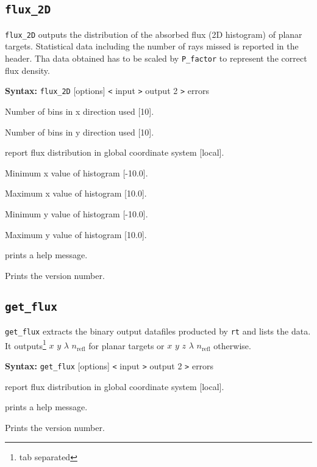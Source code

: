 \documentclass[10pt,a4paper,titlepage]{article}
\begin{document}
\subsection{{\tt flux\_2D}}
{\tt flux\_2D} outputs the distribution of the absorbed flux (2D histogram) of planar targets. Statistical data including the number of rays missed is reported in the header. Tha data obtained has to be scaled by {\tt P\_factor} to represent the correct flux density.

{\bf Syntax:} {\tt flux\_2D} [options] {\tt <} input {\tt >} output 2 {\tt >} errors
\vspace{1em}
\begin{list}{}
{\setlength{\leftmargin}{3.5cm}
\setlength{\labelwidth}{3.0cm}
\setlength{\labelsep}{0.25cm}
\setlength{\rightmargin}{0.5cm}}

\item[{\tt [--nx|-a]}] Number of bins in x direction used [10].
\item[{\tt [--ny|-b]}] Number of bins in y direction used [10].
\item[{\tt [--global|-g]}] report flux distribution in global coordinate system [local].
\item[{\tt [--minx|-x]}] Minimum x value of histogram [-10.0].
\item[{\tt [--maxx|-X]}] Maximum x value of histogram [10.0].
\item[{\tt [--miny|-y]}] Minimum y value of histogram [-10.0].
\item[{\tt [--maxy|-Y]}] Maximum y value of histogram [10.0].
\item[{\tt [--help|-h]}] prints a help message.
\item[{\tt [--Version|-V]}] Prints the version number.

\end{list}

\subsection{{\tt get\_flux}}
{\tt get\_flux} extracts the binary output datafiles producted by {\tt rt} and lists the data. It outputs\footnote{tab separated} $x$ $y$ $\lambda$ $n_{\mathrm{refl}}$ for planar targets or $x$ $y$ $z$ $\lambda$ $n_{\mathrm{refl}}$ otherwise.

{\bf Syntax:} {\tt get\_flux} [options] {\tt <} input {\tt >} output 2 {\tt >} errors
\vspace{1em}
\begin{list}{}
{\setlength{\leftmargin}{3.5cm}
\setlength{\labelwidth}{3.0cm}
\setlength{\labelsep}{0.25cm}
\setlength{\rightmargin}{0.5cm}}

\item[{\tt [--global|-g]}] report flux distribution in global coordinate system [local].
\item[{\tt [--help|-h]}] prints a help message.
\item[{\tt [--Version|-V]}] Prints the version number.

\end{list}
\end{document}
